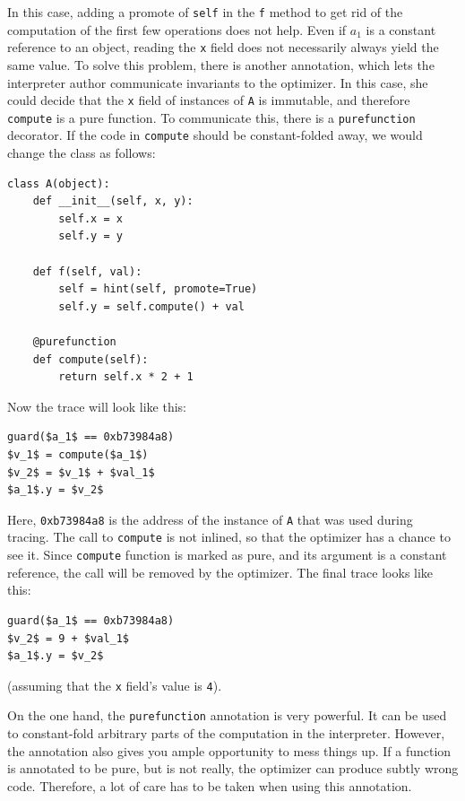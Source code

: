 \documentclass{sigplanconf}
\begin{document}
In this case, adding a promote of \texttt{self} in the \texttt{f} method to get rid of the
computation of the first few operations does not help. Even if $a_1$ is a
constant reference to an object, reading the \texttt{x} field does not necessarily
always yield the same value. To solve this problem, there is another annotation,
which lets the interpreter author communicate invariants to the optimizer. In
this case, she could decide that the \texttt{x} field of instances of \texttt{A} is
immutable, and therefore \texttt{compute}
is a pure function. To communicate this, there is a \texttt{purefunction} decorator.
If the code in \texttt{compute} should be constant-folded away, we would change the
class as follows:
\begin{lstlisting}[mathescape,basicstyle=\ttfamily]
class A(object):
    def __init__(self, x, y):
        self.x = x
        self.y = y

    def f(self, val):
        self = hint(self, promote=True)
        self.y = self.compute() + val

    @purefunction
    def compute(self):
        return self.x * 2 + 1
\end{lstlisting}

Now the trace will look like this:
%
\begin{lstlisting}[mathescape,basicstyle=\ttfamily]
guard($a_1$ == 0xb73984a8)
$v_1$ = compute($a_1$)
$v_2$ = $v_1$ + $val_1$
$a_1$.y = $v_2$
\end{lstlisting}

Here, \texttt{0xb73984a8} is the address of the instance of \texttt{A} that was used
during tracing. The call to \texttt{compute} is not inlined, so that the optimizer
has a chance to see it. Since \texttt{compute} function is marked as pure, and its
argument
is a constant reference, the call will be removed by the optimizer. The final
trace looks like this:
%
\begin{lstlisting}[mathescape,basicstyle=\ttfamily]
guard($a_1$ == 0xb73984a8)
$v_2$ = 9 + $val_1$
$a_1$.y = $v_2$
\end{lstlisting}

(assuming that the \texttt{x} field's value is \texttt{4}).

On the one hand, the \texttt{purefunction} annotation is very powerful. It can be
used to constant-fold arbitrary parts of the computation in the interpreter.
However, the annotation also gives you ample opportunity to mess things up. If a
function is annotated to be pure, but is not really, the optimizer can produce
subtly wrong code. Therefore, a lot of care has to be taken when using this
annotation.
\end{document}
